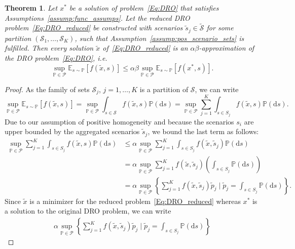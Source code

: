 \documentclass{article}
\newtheorem{theorem}{Theorem}[section]
\newcommand{\mP}{\mathcal{P}}
\newcommand{\mS}{\mathcal{S}}
\newcommand{\E}{\mathbb{E}}
\newcommand{\tS}{\tilde{\mS}}
\newcommand{\scen}[1]{s_{#1}}%
\newcommand{\newscen}[1]{\tilde{s}_{#1}}%
\newcommand{\prob}{\mathbb{P}}
\newcommand{\tx}{\tilde{x}}
\begin{document}
\begin{theorem}\label{thm:abapprox}
Let \(x^*\) be a solution of problem~\eqref{Eq:DRO} that satisfies Assumptions~\ref{assump:func_assumps}.
Let the reduced DRO problem~\eqref{Eq:DRO_reduced} be constructed with scenarios \(\newscen{j} \in \tS\) for some partition \((\mS_1,\dots,\mS_K)\), such that Assumption~\ref{assump:pos_scenario_sets} is fulfilled.
Then every solution \(\tx\) of~\eqref{Eq:DRO_reduced} is an \(\alpha\beta\)-approximation of the DRO problem~\eqref{Eq:DRO}, i.e.
\begin{equation*}
	\sup_{\prob \in \mP} \E_{s \sim \prob}[f(\tx, s)] \leq \alpha \beta \sup_{\prob \in \mP} \E_{s \sim \prob}[f(x^*, s)].
\end{equation*}
\end{theorem}
\begin{proof}%
  As the family of sets \(\mS_{j}\), \(j=1,\ldots,K\) is a partition of \(\mS\), we can write
	\begin{equation*}
		\sup_{\prob \in \mP} \E_{s \sim \prob}[f(\tx, s)]
		= \sup_{\prob \in \mP} \int_{s\in\mS} f(\tx,s) \prob(\text{d}s)
		= \sup_{\prob \in \mP} \sum_{j=1}^{K} \int_{s\in S_j} f(\tx, s)\prob(\text{d}s).
	\end{equation*}
	Due to our assumption of positive homogeneity and because the scenarios \(\scen{i}\) are upper bounded by the aggregated scenarios \(\newscen{j}\), we bound the last term as follows:
	\begin{equation*}
	\begin{aligned}
		\sup_{\prob \in \mP} \sum_{j=1}^{K} \int_{s\in S_j} f(\tx, s)\prob(\text{d}s)
		&\leq \alpha \sup_{\prob \in \mP} \sum_{j=1}^{K}\int_{s\in S_j}f(\tx, \newscen{j})\prob(\text{d}s)\\
		&= \alpha \sup_{\prob \in \mP} \sum_{j=1}^{K}f(\tx, \newscen{j})\left(\int_{s\in S_j}\prob(\text{d}s)\right)\\
		&= \alpha \sup_{\prob \in \mP} \left\{\sum_{j=1}^{K}f(\tx, \newscen{j})\tilde{p}_j \;\Big|\; \tilde{p}_j = \int_{s\in S_j}\prob(\text{d}s) \right\}.
	\end{aligned}
	\end{equation*}
	Since \(\tilde{x}\) is a minimizer for the reduced problem~\eqref{Eq:DRO_reduced} whereas \(x^*\) is a solution to the original DRO problem, we can write
	\begin{equation*}
	\begin{aligned}
		\alpha \sup_{\prob \in \mP} \left\{\sum_{j=1}^{K}f(\tx, \newscen{j})\tilde{p}_j \;\Big|\; \tilde{p}_j = \int_{s\in S_j}\prob(\text{d}s) \right\}

\end{aligned}
\end{equation*}
\end{proof}
\end{document}
